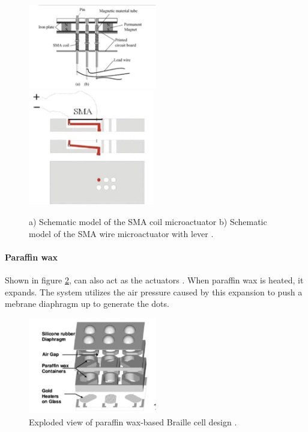 \begin{figure}[h]\centering
    \includegraphics[width=0.5\textwidth]{figures/sma-coil.png}
    \includegraphics[height=5cm]{figures/sma-mechanism.png}
    \caption{ a) Schematic model of the SMA coil microactuator b) Schematic model of the SMA wire microactuator with lever \cite{haga_dynamic_2005}.}
    \label{fig:sma}
\end{figure}

\paragraph{Paraffin wax}
Shown in figure \ref{fig:paraffin}, can also act as the actuators \cite{lee_micromachined_2005}. When paraffin wax is heated, it expands.
The system utilizes the air pressure caused by this expansion to push a mebrane diaphragm up to generate the dots.

\begin{figure}[h] \centering
    \includegraphics[width=0.5\textwidth]{figures/paraffin.png}
\caption{Exploded view of paraffin wax-based Braille cell design \cite{lee_micromachined_2005}.}
\label{fig:paraffin}
\end{figure}

